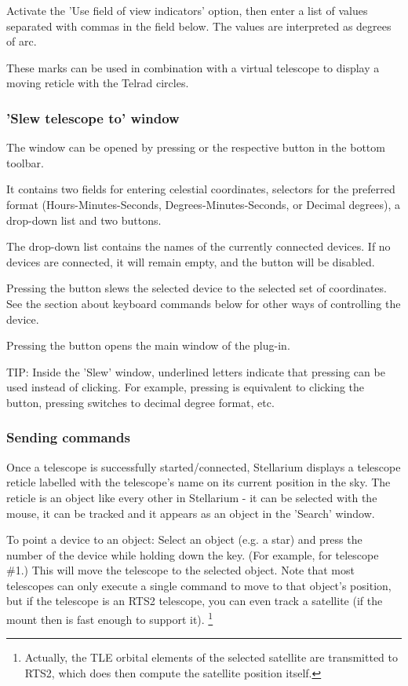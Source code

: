 Activate the 'Use field of view indicators' option, then enter
a list of values separated with commas in the field below. The values
are interpreted as degrees of arc.

These marks can be used in combination with a virtual telescope to
display a moving reticle with the Telrad circles.


\subsubsection{'Slew telescope to' window}

The  window can be opened by pressing  or the respective button in the bottom toolbar.

It contains two fields for entering celestial coordinates, selectors
for the preferred format (Hours-Minutes-Seconds,
Degrees-Minutes-Seconds, or Decimal degrees), a drop-down list and two
buttons.

The drop-down list contains the names of the currently connected
devices. If no devices are connected, it will remain empty, and the
 button will be disabled.

Pressing the  button slews the selected device to the selected set
of coordinates. See the section about keyboard commands below for
other ways of controlling the device.

Pressing the  button opens the main window of
the plug-in.

TIP: Inside the 'Slew' window, underlined letters indicate that
pressing  can be used instead of
clicking. For example, pressing  is equivalent to
clicking the  button, pressing  switches to
decimal degree format, etc.


\subsubsection{Sending commands}

Once a telescope is successfully started/connected, Stellarium
displays a telescope reticle labelled with the telescope's name on its
current position in the sky. The reticle is an object like every other
in Stellarium - it can be selected with the mouse, it can be tracked
and it appears as an object in the 'Search' window.

To point a device to an object: Select an object (e.g. a star) and
press the number of the device while holding down the \keys{\ctrl} key. (For
example,  for telescope \#1.) This will move the telescope to the
selected object. Note that most telescopes can only execute a single command to 
move to that object's position, but if the telescope is an RTS2 telescope, 
you can even track a satellite (if the mount then is fast enough to support it).%
\footnote{Actually, the TLE orbital elements of the selected satellite are transmitted 
to RTS2, which does then compute the satellite position itself.}

